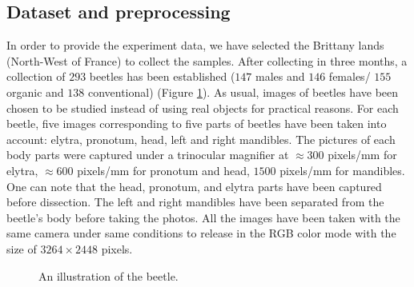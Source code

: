 \documentclass[review]{elsarticle}
\begin{document}
\subsection{Dataset and preprocessing}
\label{subsec21}
In order to provide the experiment data, we have selected the Brittany lands (North-West of France) to collect the samples. After collecting in three months, a collection of $293$ beetles has been established ($147$ males and $146$ females/ $155$ organic and $138$ conventional) (Figure \ref{imgbeetle}). As usual, images of beetles have been chosen to be studied instead of using real objects for practical reasons. For each beetle, five images corresponding to five parts of beetles have been taken into account: elytra, pronotum, head, left and right mandibles. The pictures of each body parts were captured under a trinocular magnifier at $\approx 300$ pixels/mm for elytra, $\approx 600$ pixels/mm for pronotum and head, $1500$ pixels/mm for mandibles. One can note that the head, pronotum, and elytra parts have been captured before dissection. The left and right mandibles have been separated from the beetle's body before taking the photos. All the images have been taken with the same camera under same conditions to release in the RGB color mode with the size of $3264 \times 2448$ pixels.

\begin{figure}[h!]
	\centering
	\caption{An illustration of the beetle.}
	\label{imgbeetle}
\end{figure}
\end{document}
